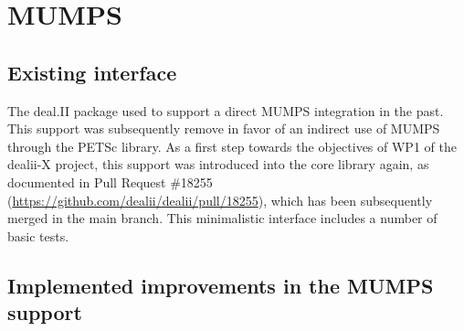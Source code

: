 \documentclass[a4paper,12pt]{article}
\begin{document}




\newpage

\section{MUMPS}
\label{sec:section2}

\subsection{Existing interface}

The deal.II package used to support a direct MUMPS integration in the
past. This support was subsequently remove in favor of an indirect use
of MUMPS through the PETSc library. As a first step towards the
objectives of WP1 of the dealii-X project, this support was introduced
into the core library again,
as documented in Pull Request \#18255
(\url{https://github.com/dealii/dealii/pull/18255}), which has been
subsequently merged in the main branch. This minimalistic interface
includes a number of basic tests.


\subsection{Implemented improvements in the MUMPS support}
\end{document}
